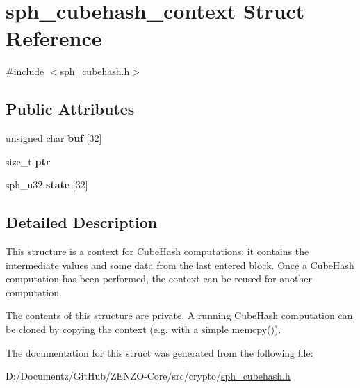 \hypertarget{structsph__cubehash__context}{}\section{sph\+\_\+cubehash\+\_\+context Struct Reference}
\label{structsph__cubehash__context}


{\ttfamily \#include $<$sph\+\_\+cubehash.\+h$>$}

\subsection*{Public Attributes}
\begin{DoxyCompactItemize}
\item 
\mbox{\label{structsph__cubehash__context_a2d988768ff925b9ad52a68c84b87fc53}} 
unsigned char {\bfseries buf} \mbox{[}32\mbox{]}
\item 
\mbox{\label{structsph__cubehash__context_adbd480e1bc0f3adff4b7558c78929980}} 
size\+\_\+t {\bfseries ptr}
\item 
\mbox{\label{structsph__cubehash__context_a5355951521097d9835aae88d335674c9}} 
sph\+\_\+u32 {\bfseries state} \mbox{[}32\mbox{]}
\end{DoxyCompactItemize}


\subsection{Detailed Description}
This structure is a context for Cube\+Hash computations\+: it contains the intermediate values and some data from the last entered block. Once a Cube\+Hash computation has been performed, the context can be reused for another computation.

The contents of this structure are private. A running Cube\+Hash computation can be cloned by copying the context (e.\+g. with a simple {\ttfamily memcpy()}). 

The documentation for this struct was generated from the following file\+:\begin{DoxyCompactItemize}
\item 
D\+:/\+Documentz/\+Git\+Hub/\+Z\+E\+N\+Z\+O-\/\+Core/src/crypto/\mbox{\hyperlink{sph__cubehash_8h}{sph\+\_\+cubehash.\+h}}\end{DoxyCompactItemize}
